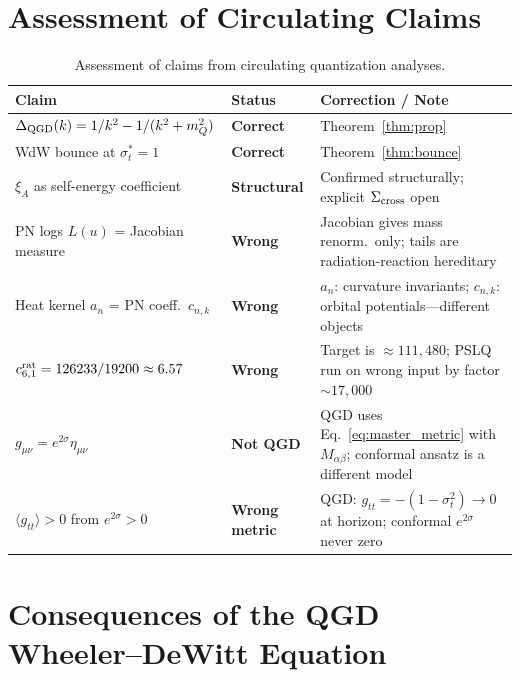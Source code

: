 \documentclass[11pt,a4paper]{article}
\theoremstyle{plain}
\theoremstyle{definition}
\theoremstyle{remark}
\newcommand{\mQ}{m_Q}
\newcommand{\xiA}{\xi_A}
\newcommand{\sigt}{\sigma_t}
\begin{document}
\section{Assessment of Circulating Claims}
\label{sec:assess}

\begin{table}[h]
\centering\small\renewcommand{\arraystretch}{1.3}
\caption{Assessment of claims from circulating quantization analyses.}
\begin{tabular}{@{}p{6cm}p{2.2cm}p{5cm}@{}}
\toprule
Claim & Status & Correction / Note \\
\midrule
\rowcolor{lightgray}
$\Delta_{\rm QGD}(k)=1/k^2-1/(k^2+\mQ^2)$ &
  \textcolor{confirmed}{\textbf{Correct}} & Theorem~\ref{thm:prop} \\
WdW bounce at $\sigt^*=1$ &
  \textcolor{confirmed}{\textbf{Correct}} & Theorem~\ref{thm:bounce} \\
\rowcolor{lightgray}
$\xiA$ as self-energy coefficient &
  \textcolor{predicted}{\textbf{Structural}} &
  Confirmed structurally; explicit $\Sigma_{\rm cross}$ open \\
PN logs $L(u)$ = Jacobian measure &
  \textcolor{wrong}{\textbf{Wrong}} &
  Jacobian gives mass renorm.\ only; tails are radiation-reaction hereditary \\
\rowcolor{lightgray}
Heat kernel $a_n$ = PN coeff.\ $c_{n,k}$ &
  \textcolor{wrong}{\textbf{Wrong}} &
  $a_n$: curvature invariants; $c_{n,k}$: orbital potentials---different objects \\
$c_{6,1}^{\rm rat}=126233/19200\approx6.57$ &
  \textcolor{wrong}{\textbf{Wrong}} &
  Target is $\approx111{,}480$; PSLQ run on wrong input by factor $\sim17{,}000$ \\
\rowcolor{lightgray}
$g_{\mu\nu}=e^{2\sigma}\eta_{\mu\nu}$ &
  \textcolor{wrong}{\textbf{Not QGD}} &
  QGD uses Eq.~\eqref{eq:master_metric} with $M_{\alpha\beta}$;
  conformal ansatz is a different model \\
$\langle g_{tt}\rangle>0$ from $e^{2\sigma}>0$ &
  \textcolor{wrong}{\textbf{Wrong metric}} &
  QGD: $g_{tt}=-(1-\sigt^2)\to0$ at horizon; conformal $e^{2\sigma}$ never zero \\
\bottomrule
\end{tabular}
\end{table}

\section{Consequences of the QGD Wheeler--DeWitt Equation}
\label{sec:WdW_consequences}
\end{document}
